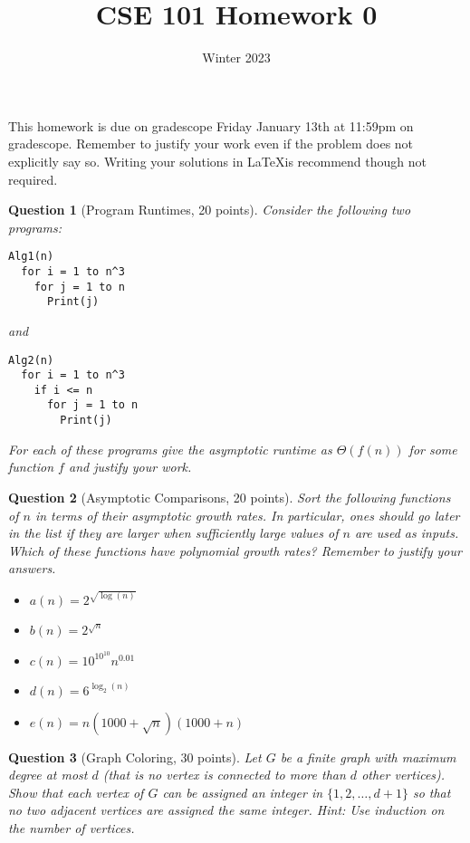 \documentclass{article}
\title{CSE 101 Homework 0}
\date{Winter 2023}
\newtheorem{ques}{Question}
\begin{document}
\maketitle

This homework is due on gradescope Friday January 13th at 11:59pm on gradescope. Remember to justify your work even if the problem does not explicitly say so. Writing your solutions in \LaTeX is recommend though not required.

\begin{ques}[Program Runtimes, 20 points]
Consider the following two programs:
\begin{verbatim}
Alg1(n)
  for i = 1 to n^3
    for j = 1 to n
      Print(j)
\end{verbatim}
and
\begin{verbatim}
Alg2(n)
  for i = 1 to n^3
    if i <= n
      for j = 1 to n
        Print(j)
\end{verbatim}
For each of these programs give the asymptotic runtime as $\Theta(f(n))$ for some function $f$ and justify your work.
\end{ques}

\begin{ques}[Asymptotic Comparisons, 20 points]
Sort the following functions of $n$ in terms of their asymptotic growth rates. In particular, ones should go later in the list if they are larger when sufficiently large values of $n$ are used as inputs. Which of these functions have polynomial growth rates? Remember to justify your answers.
\begin{itemize}
\item $a(n) = 2^{\sqrt{\log(n)}}$
\item $b(n) = 2^{\sqrt{n}}$
\item $c(n) = 10^{10^{10}}n^{0.01}$
\item $d(n) = 6^{\log_2(n)}$
\item $e(n) = n(1000+\sqrt{n})(1000+n)$
\end{itemize}
\end{ques}

\begin{ques}[Graph Coloring, 30 points]
Let $G$ be a finite graph with maximum degree at most $d$ (that is no vertex is connected to more than $d$ other vertices). Show that each vertex of $G$ can be assigned an integer in $\{1,2,\ldots,d+1\}$ so that no two adjacent vertices are assigned the same integer. Hint: Use induction on the number of vertices.
\end{ques}
\end{document}
